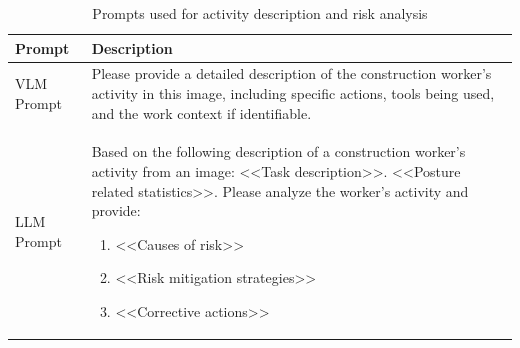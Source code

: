 \documentclass[11pt]{article}
\renewcommand{\baselinestretch}{1.5}
\begin{document}



\begin{table}[H]
\renewcommand{\baselinestretch}{1.0}\selectfont %
\renewcommand{\arraystretch}{0.92}              %
\setlength{\tabcolsep}{4pt}                     %
\centering
\small
\caption{Prompts used for activity description and risk analysis}
\begin{tabular}{p{3.2cm} p{11.5cm}}
\toprule
\textbf{Prompt} & \textbf{Description} \\
\midrule
VLM Prompt & \ttfamily Please provide a detailed description of the construction worker's activity in this image, including specific actions, tools being used, and the work context if identifiable. \\[0.5em]
LLM Prompt & \ttfamily Based on the following description of a construction worker's activity from an image: <<Task description>>. <<Posture related statistics>>. \newline\newline 
Please analyze the worker’s activity and provide: 
\begin{enumerate}[nosep, leftmargin=*]
    \item <<Causes of risk>>
    \item <<Risk mitigation strategies>>
    \item <<Corrective actions>>
\end{enumerate} \\
\bottomrule
\end{tabular}
\label{table:prompts}
\end{table}
\end{document}
